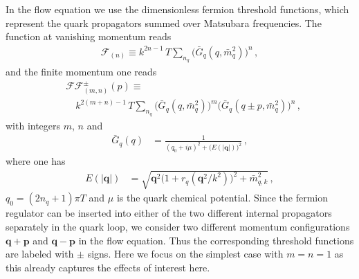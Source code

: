 \documentclass[reprint,english,superscriptaddress,preprintnumbers,amsmath,amssymb,aps,prd,nofootinbib]{revtex4-2}
\newcommand{\bs}[1]{\boldsymbol{#1}}
\begin{document}
%
In the flow equation we use the dimensionless fermion threshold functions, which represent the quark propagators summed over Matsubara frequencies. The function at vanishing momentum reads
%
\begin{align}
  \mathcal{F}_{(n)}\equiv k^{2n-1}\,T\sum_{n_q}\Big(\bar G_q(q, \bar m^2_{q})\Big)^n \,,\label{eq:Fn}
\end{align}
%
and the finite momentum one reads
%
\begin{align}
\nonumber
  &\mathcal{FF}^{\pm}_{(m,n)}(p)\equiv\\ 
  &\quad k^{2(m+n)-1}\,T\sum_{n_q}\Big(\bar G_q(q, \bar m^2_{q})\Big)^m \Big(\bar G_q(q\pm p, \bar m^2_{q})\Big)^n\,,\label{eq:FFmn}
\end{align}
%
with integers $m$, $n$ and
%
\begin{align}
  \bar G_{q}(q)&=\frac{1}{(q_0+i \mu)^2+\big(E(|\bs{q}|)\big)^2} \,,\label{eq: barGq2}
\end{align}
%
where one has
%
\begin{align}
  E(|\bs{q}|)&=\sqrt{\bs{q}^2\big(1+r_q(\bs{q}^2/k^2)\big)^2+\bar m_{q,k}^2}\,,
\end{align}
%
$q_0=(2n_q+1)\pi T $ and $\mu$ is the quark chemical potential. Since the fermion regulator can be inserted into either of the two different internal propagators separately in the quark loop, we consider two different momentum configurations $\bs{q}+\bs{p}$ and $\bs{q}-\bs{p}$ in the flow equation. Thus the corresponding threshold functions are labeled with $\pm$ signs. Here we focus on the simplest case with $m=n=1$ as this already captures the effects of interest here.
\end{document}
